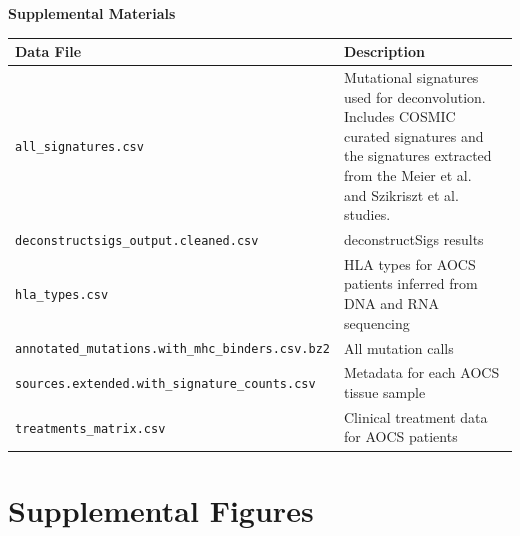 
\pagebreak
\begin{center}
\textbf{\large Supplemental Materials}
\end{center}

\setcounter{equation}{0}
\setcounter{figure}{0}
\setcounter{table}{0}
\makeatletter
\renewcommand{\theequation}{S\arabic{equation}}
\renewcommand{\thefigure}{S\arabic{figure}}

\begin{center}
    \begin{tabular}{ | l | p{8cm} |}
    \hline
    Data File & Description \\ \hline
    \texttt{all\_signatures.csv} & Mutational signatures used for deconvolution. Includes COSMIC curated signatures and the signatures extracted from the Meier et al.~\cite{Meier_2014} and Szikriszt et al.~\cite{Szikriszt_2016} studies. \\ \hline
    \texttt{deconstructsigs\_output.cleaned.csv} & deconstructSigs results \\ \hline
    \texttt{hla\_types.csv} & HLA types for AOCS patients inferred from DNA and RNA sequencing \\ \hline
    \texttt{annotated\_mutations.with\_mhc\_binders.csv.bz2} & All mutation calls \\ \hline
    \texttt{sources.extended.with\_signature\_counts.csv} & Metadata for each AOCS tissue sample \\ \hline
    \texttt{treatments\_matrix.csv} & Clinical treatment data for AOCS patients \\ \hline
    \end{tabular}
\end{center}


\section*{Supplemental Figures}

\FloatBarrier


